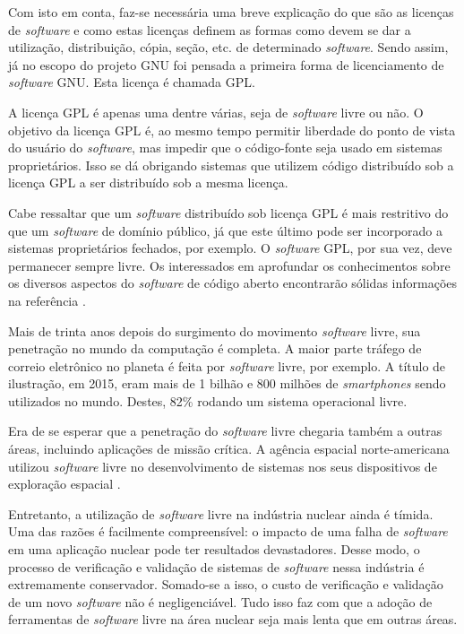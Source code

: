 Com isto em conta, faz-se necessária uma breve explicação do que são as licenças
de \textit{software} e como estas licenças definem as formas como devem se dar a utilização, distribuição, cópia, seção, etc. de determinado \textit{software}. Sendo assim,
já no escopo do projeto GNU \cite{Stallman1985} foi pensada a primeira forma
de licenciamento de \textit{software}
GNU. Esta licença é chamada GPL.

A licença GPL é apenas uma dentre várias, seja de \textit{software} livre ou
não. O objetivo da licença GPL é, ao mesmo tempo permitir liberdade do ponto de vista
do usuário do \textit{software}, mas impedir que o código-fonte seja usado em sistemas proprietários. Isso se dá obrigando sistemas que utilizem código
distribuído sob a licença GPL a ser distribuído sob a mesma licença.

Cabe ressaltar que um \textit{software} distribuído sob licença GPL é mais restritivo do
que um \textit{software} de domínio público, já que este último pode ser incorporado
a sistemas proprietários fechados, por exemplo. O \textit{software} GPL, por sua vez,
deve permanecer sempre livre. Os interessados em aprofundar os conhecimentos sobre
os diversos aspectos do \textit{software} de código aberto encontrarão sólidas informações
na referência \cite{Androutsellis2010}.

Mais de trinta anos depois do surgimento do movimento \textit{software} livre,
sua penetração no mundo da computação é completa. A maior parte tráfego de correio
eletrônico no planeta é feita por \textit{software} livre, por exemplo.  A título
de ilustração, em 2015, eram mais de 1 bilhão e 800 milhões de \textit{smartphones}
sendo utilizados no mundo. Destes, 82\% rodando um sistema operacional livre.

Era de se esperar que a penetração do \textit{software} livre chegaria também a outras
áreas, incluindo aplicações de missão crítica. A agência espacial norte-americana
utilizou \textit{software} livre no desenvolvimento de sistemas nos seus dispositivos
de exploração espacial \cite{Norris2004}.

Entretanto, a utilização de \textit{software} livre na indústria nuclear ainda é tímida.
Uma das razões é facilmente compreensível: o impacto de uma falha de \textit{software}
em uma aplicação nuclear pode ter resultados devastadores. Desse modo, o processo de
verificação e validação de sistemas de \textit{software} nessa indústria é extremamente
conservador. Somado-se a isso, o custo de verificação e validação de um novo \textit{software}
não é negligenciável. Tudo isso faz com que a adoção de ferramentas de \textit{software}
livre na área nuclear seja mais lenta que em outras áreas.

